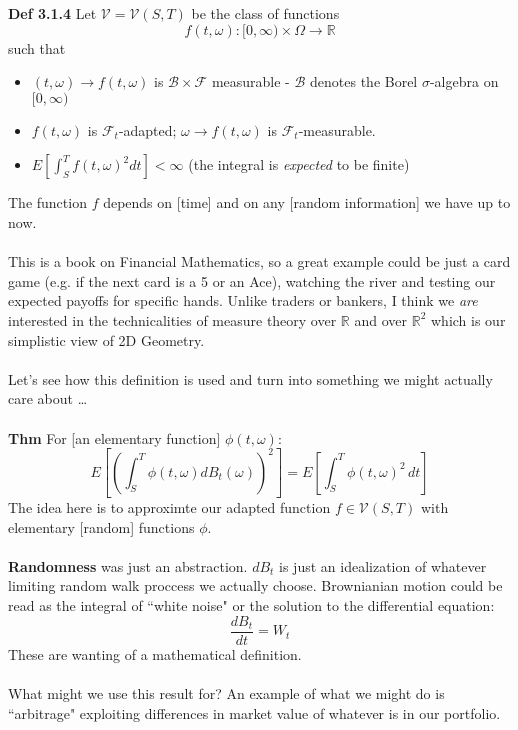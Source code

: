 \documentclass[12pt]{article}
\begin{document}
{\noindent \textbf{Def 3.1.4}
Let $\mathcal{V} = \mathcal{V}(S,T)$ be the class of functions
$$f(t,\omega): [0, \infty) \times \Omega \to \mathbb{R} $$
such that 
\begin{itemize}
\item $(t,\omega)\to f(t, \omega) $ is $\mathcal{B} \times \mathcal{F}$ measurable - $\mathcal{B}$ denotes the Borel $\sigma$-algebra on $[0, \infty)$
\item $f(t, \omega)$ is $\mathcal{F}_t$-adapted; \quad\quad $\omega \to f(t,\omega)$ is $\mathcal{F}_t$-measurable.
\item $E[\int_S^T f(t,\omega)^2 dt] < \infty $ (the integral is \textit{expected} to be finite)
\end{itemize}
The function $f$ depends on [time] and on any [random information] we have up to now. \\ \\
This is a book on Financial Mathematics, so a great example could be just a {\color{blue}card game} (e.g. if the next card is a 5 or an Ace), watching the river and testing our expected payoffs for specific hands.  Unlike traders or bankers, I think we \textit{are} interested in the technicalities of measure theory over $\mathbb{R}$ and over $\mathbb{R}^2$ which is our simplistic view of 2D Geometry. \\ \\
Let's see how this definition is used and turn into something we might actually care about \dots \\ \\
\textbf{Thm} For [an elementary function] $\phi(t,\omega)$:
$$ E \left[ \left( \int_S^T \phi(t,\omega) dB_t(\omega) \right)^2 \right] = E \left[ \int_S^T \phi(t, \omega)^2\, dt \right] $$
The idea here is to approximte our adapted function $f \in \mathcal{V}(S,T)$ with elementary [random] functions $\phi$. \\ \\
{\color{blue}\textbf{Randomness}} was just an abstraction. $dB_t$ is just an idealization of whatever limiting random walk proccess we actually choose.  Brownianian motion could be read as the integral of ``white noise" or the solution to the differential equation:
$$ \frac{dB_t}{dt} = W_t $$
These are wanting of a mathematical definition. \\ \\
What might we use this result for? An example of what we might do is ``arbitrage" exploiting differences in market value of whatever is in our portfolio.  \\ \\
}
\end{document}

